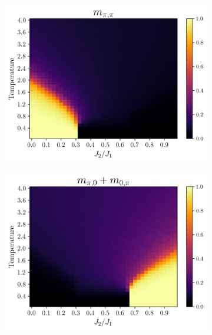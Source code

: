 \documentclass[../thesis_main.tex]{subfiles}
\begin{document}
\begin{figure}[!htb]
    \centering
    \begin{subfigure}[b]{0.43\textwidth}  %
        \centering
        \includegraphics[width=\textwidth]{images/j1-j2/phase_diagrams/p=0.25/M_pi,pi_p=0.25.png}
    \end{subfigure}
    \begin{subfigure}[b]{0.43\textwidth}
        \centering
        \includegraphics[width=\textwidth]{images/j1-j2/phase_diagrams/p=0.25/M_pi,0_p=0.25.png}
    \end{subfigure}
    \begin{subfigure}[b]{0.43\textwidth}

\end{subfigure}
\end{figure}
\end{document}
